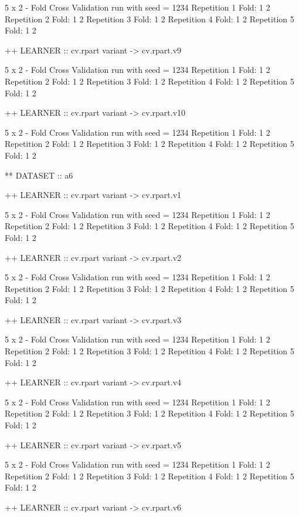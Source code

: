 \documentclass{article}
\begin{document}
\begin{Schunk}
\begin{Soutput}
 5 x 2 - Fold Cross Validation run with seed =  1234 
Repetition  1 
Fold:  1  2
Repetition  2 
Fold:  1  2
Repetition  3 
Fold:  1  2
Repetition  4 
Fold:  1  2
Repetition  5 
Fold:  1  2


++ LEARNER :: cv.rpart  variant ->  cv.rpart.v9 

 5 x 2 - Fold Cross Validation run with seed =  1234 
Repetition  1 
Fold:  1  2
Repetition  2 
Fold:  1  2
Repetition  3 
Fold:  1  2
Repetition  4 
Fold:  1  2
Repetition  5 
Fold:  1  2


++ LEARNER :: cv.rpart  variant ->  cv.rpart.v10 

 5 x 2 - Fold Cross Validation run with seed =  1234 
Repetition  1 
Fold:  1  2
Repetition  2 
Fold:  1  2
Repetition  3 
Fold:  1  2
Repetition  4 
Fold:  1  2
Repetition  5 
Fold:  1  2


** DATASET :: a6

++ LEARNER :: cv.rpart  variant ->  cv.rpart.v1 

 5 x 2 - Fold Cross Validation run with seed =  1234 
Repetition  1 
Fold:  1  2
Repetition  2 
Fold:  1  2
Repetition  3 
Fold:  1  2
Repetition  4 
Fold:  1  2
Repetition  5 
Fold:  1  2


++ LEARNER :: cv.rpart  variant ->  cv.rpart.v2 

 5 x 2 - Fold Cross Validation run with seed =  1234 
Repetition  1 
Fold:  1  2
Repetition  2 
Fold:  1  2
Repetition  3 
Fold:  1  2
Repetition  4 
Fold:  1  2
Repetition  5 
Fold:  1  2


++ LEARNER :: cv.rpart  variant ->  cv.rpart.v3 

 5 x 2 - Fold Cross Validation run with seed =  1234 
Repetition  1 
Fold:  1  2
Repetition  2 
Fold:  1  2
Repetition  3 
Fold:  1  2
Repetition  4 
Fold:  1  2
Repetition  5 
Fold:  1  2


++ LEARNER :: cv.rpart  variant ->  cv.rpart.v4 

 5 x 2 - Fold Cross Validation run with seed =  1234 
Repetition  1 
Fold:  1  2
Repetition  2 
Fold:  1  2
Repetition  3 
Fold:  1  2
Repetition  4 
Fold:  1  2
Repetition  5 
Fold:  1  2


++ LEARNER :: cv.rpart  variant ->  cv.rpart.v5 

 5 x 2 - Fold Cross Validation run with seed =  1234 
Repetition  1 
Fold:  1  2
Repetition  2 
Fold:  1  2
Repetition  3 
Fold:  1  2
Repetition  4 
Fold:  1  2
Repetition  5 
Fold:  1  2


++ LEARNER :: cv.rpart  variant ->  cv.rpart.v6 


\end{Soutput}
\end{Schunk}
\end{document}

